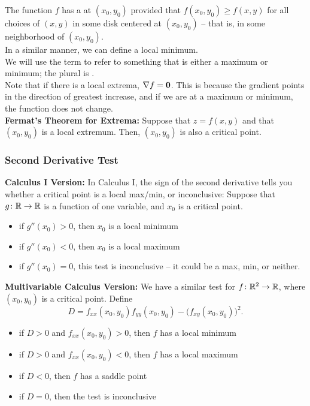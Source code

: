 The function \(f\) has a  at \((x_{0}, y_{0})\) provided that \(f(x_{0}, y_{0}) \geq f(x, y)\) for all choices of \((x, y)\) in some disk centered at \((x_{0}, y_{0})\) – that is, in some neighborhood of \((x_{0}, y_{0})\). \\

In a similar manner, we can define a local minimum. \\


We will use the term  to refer to something that is either a maximum or minimum; the plural is . \\

Note that if there is a local extrema, \(\nabla f = \mathbf{0}\). This is because the gradient points in the direction of greatest increase, and if we are at a maximum or minimum, the function does not change. \\

\textbf{Fermat's Theorem for Extrema:} Suppose that \(z = f(x, y)\) and that \((x_{0}, y_{0})\) is a local extremum. Then, \((x_{0}, y_{0})\) is also a critical point.

\subsubsection{Second Derivative Test}

\textbf{Calculus I Version:} In Calculus I, the sign of the second derivative tells you whether a critical point is a local max/min, or inconclusive: Suppose that \(g \colon \mathbb{R} \to \mathbb{R}\) is a function of one variable, and \(x_{0}\) is a critical point.

\begin{itemize}
    \item if \(g''(x_{0}) > 0\), then \(x_{0}\) is a local minimum
    \item if \(g''(x_{0}) < 0\), then \(x_{0}\) is a local maximum
    \item if \(g''(x_{0}) = 0\), this test is inconclusive – it could be a max, min, or neither.
\end{itemize}

\newpage

\textbf{Multivariable Calculus Version:} We have a similar test for \(f \colon \mathbb{R}^{2} \to \mathbb{R}\), where \((x_{0}, y_{0})\) is a critical point. Define
\[
D = f_{xx}(x_{0}, y_{0})f_{yy}(x_{0}, y_{0}) - \bigl(f_{xy}(x_{0}, y_{0})\bigr)^{2}.
\]

\begin{itemize}
    \item if \(D > 0\) and \(f_{xx}(x_{0}, y_{0}) > 0\), then \(f\) has a local minimum
    \item if \(D > 0\) and \(f_{xx}(x_{0}, y_{0}) < 0\), then \(f\) has a local maximum
    \item if \(D < 0\), then \(f\) has a saddle point
    \item if \(D = 0\), then the test is inconclusive
\end{itemize}

